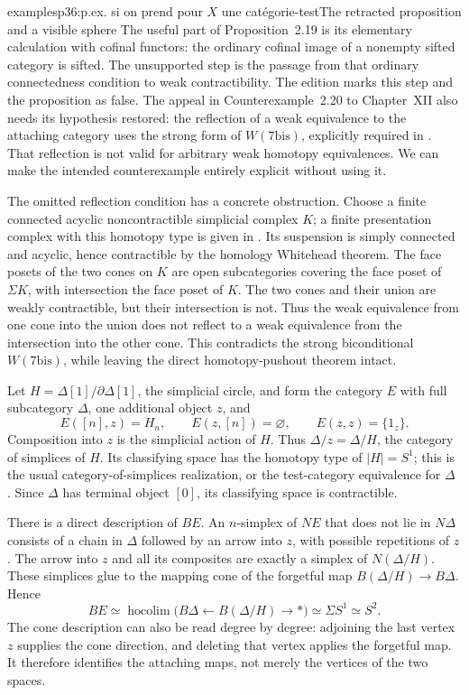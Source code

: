 \begin{dcomment}{examples}{p36:p.ex. si on prend pour $X$ une catégorie-test}{The retracted proposition and a visible sphere}
The useful part of Proposition~2.19 is its elementary calculation with cofinal functors: the ordinary cofinal image of a nonempty sifted category is sifted. The unsupported step is the passage from that ordinary connectedness condition to weak contractibility. The edition marks this step and the proposition as false. The appeal in Counterexample~2.20 to Chapter~XII also needs its hypothesis restored: the reflection of a weak equivalence to the attaching category uses the strong form of $W(7\mathrm{bis})$, explicitly required in \citet[Chapter~XII, Section~V.3.4, Corollary~4, note~104]{Grothendieck1990XII}. That reflection is not valid for arbitrary weak homotopy equivalences. We can make the intended counterexample entirely explicit without using it.

The omitted reflection condition has a concrete obstruction. Choose a finite connected acyclic noncontractible simplicial complex $K$; a finite presentation complex with this homotopy type is given in \citet[Example~2.38 and Theorem~2C.5]{Hatcher2002}. Its suspension is simply connected and acyclic, hence contractible by the homology Whitehead theorem. The face posets of the two cones on $K$ are open subcategories covering the face poset of $\Sigma K$, with intersection the face poset of $K$. The two cones and their union are weakly contractible, but their intersection is not. Thus the weak equivalence from one cone into the union does not reflect to a weak equivalence from the intersection into the other cone. This contradicts the strong biconditional $W(7\mathrm{bis})$, while leaving the direct homotopy-pushout theorem intact.

Let $H=\Delta[1]/\partial\Delta[1]$, the simplicial circle, and form the category $E$ with full subcategory $\Delta$, one additional object $z$, and
\[
 E([n],z)=H_n,\qquad E(z,[n])=\varnothing,
 \qquad E(z,z)=\{1_z\}.
\]
Composition into $z$ is the simplicial action of $H$. Thus $\Delta/z=\Delta/H$, the category of simplices of $H$. Its classifying space has the homotopy type of $|H|=S^1$; this is the usual category-of-simplices realization, or the test-category equivalence for $\Delta$ \citep[Proposition~1.7.14]{Maltsiniotis2020}. Since $\Delta$ has terminal object $[0]$, its classifying space is contractible.

There is a direct description of $B E$. An $n$-simplex of $N E$ that does not lie in $N\Delta$ consists of a chain in $\Delta$ followed by an arrow into $z$, with possible repetitions of $z$. The arrow into $z$ and all its composites are exactly a simplex of $N(\Delta/H)$. These simplices glue to the mapping cone of the forgetful map $B(\Delta/H)\longrightarrow B\Delta$. Hence
\[
 B E\simeq\operatorname{hocolim}\bigl(B\Delta\longleftarrow
 B(\Delta/H)\longrightarrow *\bigr)\simeq\Sigma S^1\simeq S^2.
\]
The cone description can also be read degree by degree: adjoining the last vertex $z$ supplies the cone direction, and deleting that vertex applies the forgetful map. It therefore identifies the attaching maps, not merely the vertices of the two spaces.


\end{dcomment}
